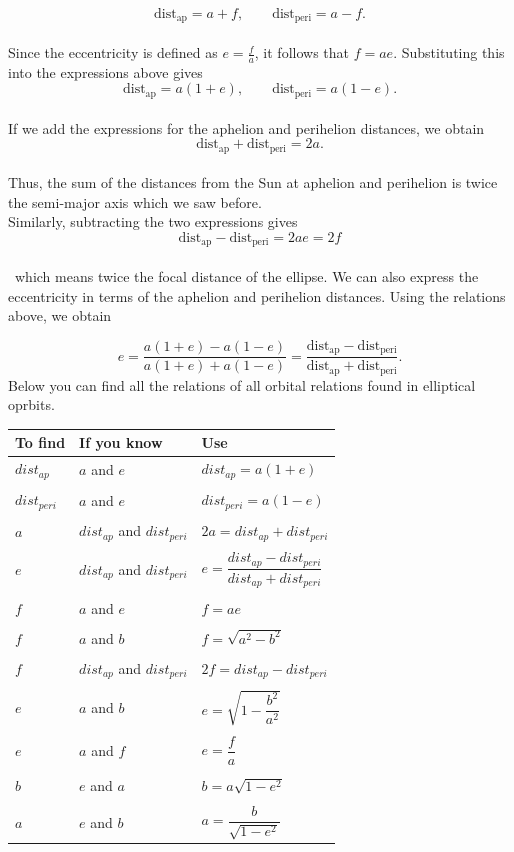 \documentclass{article}
\begin{document}
\[
\text{dist}_{\text{ap}} = a + f, \qquad
\text{dist}_{\text{peri}} = a - f.
\]
\\
Since the eccentricity is defined as $e = \frac{f}{a}$, it follows that $f = ae$.
Substituting this into the expressions above gives
\[
\text{dist}_{\text{ap}} = a(1 + e), \qquad
\text{dist}_{\text{peri}} = a(1 - e).
\]
\\
If we add the expressions for the aphelion and perihelion distances, we obtain
\[
\text{dist}_{\text{ap}} + \text{dist}_{\text{peri}} = 2a.
\]
\\
Thus, the sum of the distances from the Sun at aphelion and perihelion is twice
the semi-major axis which we saw before. 
\\
Similarly, subtracting the two expressions gives
\[
\text{dist}_{\text{ap}} - \text{dist}_{\text{peri}} = 2ae = 2f
\]
\\\
which means twice the focal distance of the ellipse.
We can also express the eccentricity in terms of the aphelion and perihelion
distances. Using the relations above, we obtain

\[
e = \frac{a(1+e) - a(1-e)}{a(1+e) + a(1-e)}
  = \frac{\text{dist}_{\text{ap}} - \text{dist}_{\text{peri}}}
         {\text{dist}_{\text{ap}} + \text{dist}_{\text{peri}}}.
\]
\newpage
\noindent
Below you can find all the relations of all orbital relations found in elliptical oprbits. 
\\[1EM]
\begin{table}[h]
\centering
\begin{tabular}{lll}
\hline
\textbf{To find} & \textbf{If you know} & \textbf{Use} \\
\hline
$dist_{ap}$ & $a$ and $e$ & $dist_{ap} = a(1+e)$ \\
\\[1EM]
$dist_{peri}$ & $a$ and $e$ & $dist_{peri} = a(1-e)$ \\
\\[1EM]
$a$ & $dist_{ap}$ and $dist_{peri}$ & $2a = dist_{ap} + dist_{peri}$ \\
\\[1EM]
$e$ & $dist_{ap}$ and $dist_{peri}$ &
$e = \dfrac{dist_{ap} - dist_{peri}}{dist_{ap} + dist_{peri}}$ \\
\\[1EM]
$f$ & $a$ and $e$ & $f = ae$ \\
\\[1EM]
$f$ & $a$ and $b$ & $f = \sqrt{a^2 - b^2}$ \\
\\[1EM]
$f$ & $dist_{ap}$ and $dist_{peri}$ & $2f = dist_{ap} - dist_{peri}$ \\
\\[1EM]
$e$ & $a$ and $b$ & $e = \sqrt{1 - \dfrac{b^2}{a^2}}$ \\
\\[1EM]
$e$ & $a$ and $f$ & $e = \dfrac{f}{a}$ \\
\\[1EM]
$b$ & $e$ and $a$ & $b = a\sqrt{1-e^2}$ \\
\\[1EM]
$a$ & $e$ and $b$ & $a = \dfrac{b}{\sqrt{1-e^2}}$ \\
\hline
\end{tabular}
\end{table}
\newpage
\end{document}
